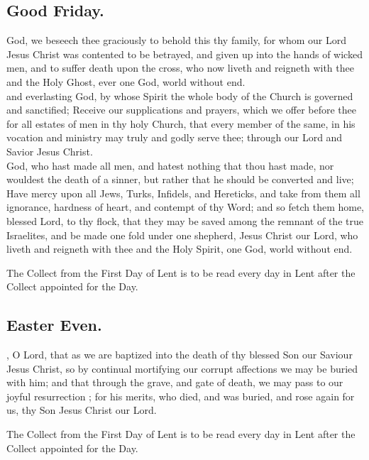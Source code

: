 \subsection{Good Friday.}
 God, we beseech thee graciously to behold this thy family, for whom our Lord Jesus Christ was contented to be betrayed, and given up into the hands of wicked men, and to suffer death upon the cross, who now liveth and reigneth with thee and the Holy Ghost, ever one God, world without end.
\\
 and everlasting God, by whose Spirit the whole body of the Church is governed and sanctified; Receive our supplications and prayers, which we offer before thee for all estates of men in thy holy Church, that every member of the same, in his vocation and ministry may truly and godly serve thee; through our Lord and Savior Jesus Christ.
\\
 God, who hast made all men, and hatest nothing that thou hast made, nor wouldest the death of a sinner, but rather that he should be converted and live; Have mercy upon all Jews, Turks, Infidels, and Hereticks, and take from them all ignorance, hardness of heart, and contempt of thy Word; and so fetch them home, blessed Lord, to thy flock, that they may be saved among the remnant of the true Israelites, and be made one fold under one shepherd, Jesus Christ our Lord, who liveth and reigneth with thee and the Holy Spirit, one God, world without end.
\\
\begin{secrubric}
The Collect from the First Day of Lent is to be read every day in Lent after the Collect appointed for the Day.
\end{secrubric}

\subsection{Easter Even.}
, O Lord, that as we are baptized into the death of thy blessed Son our Saviour Jesus Christ, so by continual mortifying our corrupt affections we may be buried with him; and that through the grave, and gate of death, we may pass to our joyful resurrection ; for his merits, who died, and was buried, and rose again for us, thy Son Jesus Christ our Lord.
\begin{secrubric}
The Collect from the First Day of Lent is to be read every day in Lent after the Collect appointed for the Day.
\end{secrubric}

